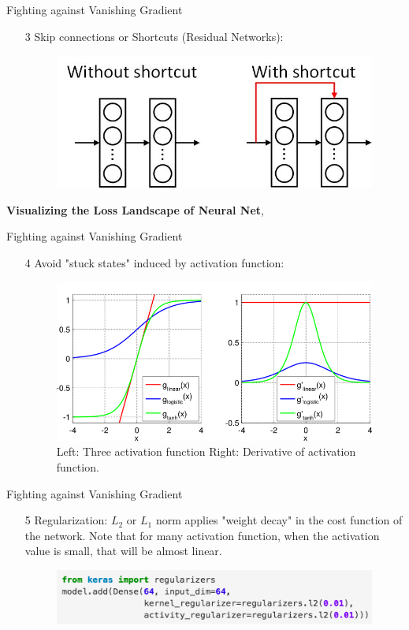 \documentclass[xcolor=pdftex,dvipsnames,table,mathserif]{beamer}
\begin{document}
\begin{frame}{Fighting against Vanishing Gradient}
\begin{enumerate}
\item[3] Skip connections or Shortcuts (Residual Networks): 
\begin{figure}
\includegraphics[width=.65 \columnwidth]{../graphics/shortcut}
\end{figure}
\end{enumerate}
\textbf{Visualizing the Loss Landscape of Neural Net}, \cite{li2017visualizing}

\end{frame}

\begin{frame}{Fighting against Vanishing Gradient}
\begin{enumerate}
\item[4] Avoid "stuck states" induced by activation function: 
\begin{figure}
\includegraphics[width=.85 \columnwidth]{../graphics/nnet-error-functions2}
\caption{Left: Three activation function Right: Derivative of activation function.}
\end{figure}
\end{enumerate}
\end{frame}

\begin{frame}{Fighting against Vanishing Gradient}
\begin{enumerate}
\item[5] Regularization: $L_2$ or $L_1$ norm applies "weight decay" in the cost function of the network. Note that for many activation function, when the activation value is small, that will be almost linear.
\begin{figure}
\includegraphics[width=.75 \columnwidth]{../graphics/KerasRegularizer}
\end{figure}

\end{enumerate}
\end{frame}
\end{document}
